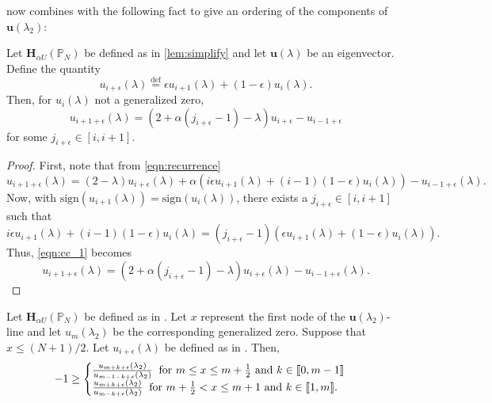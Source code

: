      now combines with the following fact to give an ordering of the components of $\mathbf{u}(\lambda_2)$:
    \begin{lem}\label{lem:convex_combinations}
    	Let $\mathbf{H}_{\alpha U}(\mathbb{P}_N)$ be defined as in \cref{lem:simplify} and let $\mathbf{u}(\lambda)$ be an eigenvector. Define the quantity
    	\begin{equation}\label{def:convex_combinations}
    		u_{i+\epsilon}(\lambda) \stackrel{\text{def}}{=} \epsilon u_{i+1}(\lambda) + (1-\epsilon)u_{i}(\lambda).
    	\end{equation}
	Then, for $u_{i}(\lambda)$ not a generalized zero,
	\begin{equation}\label{eqn:recurrence_cc}
	  u_{i+1+\epsilon}(\lambda) = \left(2+\alpha(j_{i+\epsilon}-1)-\lambda\right)u_{i+\epsilon} - u_{i-1+\epsilon}
	\end{equation}
	for some $j_{i+\epsilon} \in \left[i,i+1\right]$.
    \end{lem}
    \begin{proof}
    	First, note that from \cref{eqn:recurrence}
    	\begin{equation}\label{eqn:cc_1}
    		u_{i+1+\epsilon}(\lambda) = \left(2-\lambda\right)u_{i+\epsilon}(\lambda) + \alpha \left(i \epsilon u_{i+1}(\lambda) + (i-1)(1-\epsilon)u_{i}(\lambda) \right) -  u_{i-1+\epsilon}(\lambda).
    	\end{equation}
	Now, with $\text{sign}(u_{i+1}(\lambda))=\text{sign}(u_i(\lambda))$, there exists a $j_{i+\epsilon} \in \left[i,i+1\right]$ such that
	\begin{equation}
		i \epsilon u_{i+1}(\lambda) + (i-1)(1-\epsilon)u_{i}(\lambda) = (j_{i+\epsilon}-1) \left(\epsilon u_{i+1}(\lambda) + (1-\epsilon)u_{i}(\lambda)\right).
	\end{equation}
	Thus, \cref{eqn:cc_1} becomes
	\begin{equation}
    		u_{i+1+\epsilon}(\lambda) = \left(2+\alpha (j_{i+\epsilon}-1) -\lambda\right)u_{i+\epsilon}(\lambda) -  u_{i-1+\epsilon}(\lambda).
    	\end{equation}
    \end{proof}
    \begin{lem}\label{lem:ordering_2}
    	Let $\mathbf{H}_{\alpha U}(\mathbb{P}_N)$ be defined as in . Let $x$ represent the first node of the $\mathbf{u}(\lambda_2)$-line and let $u_m(\lambda_2)$ be the corresponding generalized zero. Suppose that $x \leq (N+1)/2$. Let $u_{i+\epsilon}(\lambda)$ be defined as in . Then,
    	\begin{equation}
	-1 \geq \begin{cases}
 			\frac{u_{m+k+\epsilon}(\lambda_2)}{u_{m-1-k+\epsilon}(\lambda_2)} \; \; \text{for $m \leq x \leq m + \frac{1}{2}$ and $k \in \left \llbracket 0 , m-1 \right \rrbracket$} \\
 			\frac{u_{m+k+\epsilon}(\lambda_2)}{u_{m-k+\epsilon}(\lambda_2)} \; \; \text{for $m + \frac{1}{2} < x \leq m + 1$ and $k \in \left \llbracket 1 , m \right \rrbracket$}.
 		\end{cases}
 	\end{equation}
    \end{lem}


